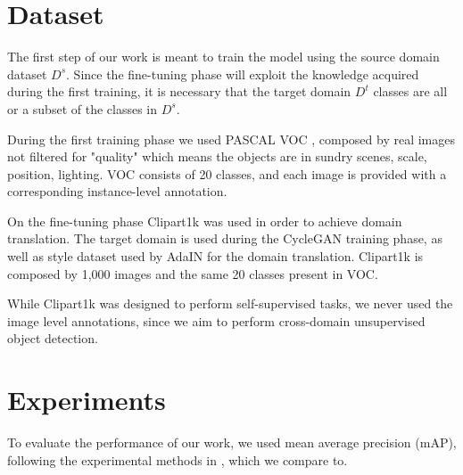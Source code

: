 \documentclass[10pt,twocolumn,letterpaper]{article}
\begin{document}
\section{Dataset}
The first step of our work is meant to train the model using the source domain dataset \(\mathit{D^s}\). Since the fine-tuning phase will exploit the knowledge acquired during the first training, it is necessary that the target domain \(\mathit{D^t}\) classes are all or a subset of the classes in \(\mathit{D^s}\).

During the first training phase we used PASCAL VOC \cite{VOC}, composed by real images not filtered for "quality" which means the objects are in sundry scenes, scale, position, lighting.
VOC consists of 20 classes, and each image is provided with a corresponding instance-level annotation.

On the fine-tuning phase Clipart1k \cite{CrossDomObjDet} was used in order to achieve domain translation. The target domain is used during the CycleGAN \cite{CGAN} training phase, as well as style dataset used by AdaIN \cite{AdaIN} for the domain translation.
Clipart1k is composed by 1,000 images and the same 20 classes present in VOC.

While Clipart1k was designed to perform self-supervised tasks, we never used the image level annotations, since we aim to perform cross-domain unsupervised object detection. 

\section{Experiments}
To evaluate the performance of our work, we used mean average precision (mAP), following the experimental methods in \cite{CrossDomObjDet}, which we compare to.  
\end{document}
